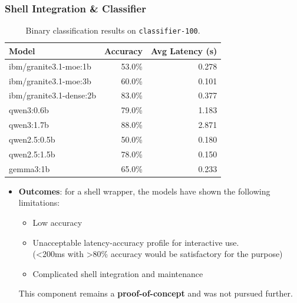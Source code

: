 \documentclass[10pt,aspectratio=169]{beamer}
\begin{document}
\begin{frame}
    \frametitle{Shell Integration \& Classifier}

    \begin{table}[h]
      \centering
      \scriptsize
      \caption{Binary classification results on \texttt{classifier-100}.}
        \begin{tabular}{lrr}
        \toprule
        \textbf{Model} & \textbf{Accuracy} & \textbf{Avg Latency (s)} \\
        \midrule
        ibm/granite3.1-moe:1b & 53.0\% & 0.278 \\
        ibm/granite3.1-moe:3b & 60.0\% & 0.101 \\
        ibm/granite3.1-dense:2b & 83.0\% & 0.377 \\
        qwen3:0.6b & 79.0\% & 1.183 \\
        qwen3:1.7b & 88.0\% & 2.871 \\
        qwen2.5:0.5b & 50.0\% & 0.180 \\
        qwen2.5:1.5b & 78.0\% & 0.150 \\
        gemma3:1b & 65.0\% & 0.233 \\
        \bottomrule
      \end{tabular}\label{tab:eval-classifier-results}
    \end{table}

    \begin{itemize}
        \item \textbf{Outcomes}: for a shell wrapper, the models have shown the
            following limitations:
            \begin{itemize}
                \item Low accuracy
                \item Unacceptable latency-accuracy profile for interactive
                    use.\\
                    (<200ms with >80\% accuracy would be satisfactory for the
                    purpose)
                \item Complicated shell integration and maintenance
            \end{itemize}
            This component remains a \textbf{proof-of-concept} and was not
            pursued further.
    \end{itemize}
\end{frame}
\end{document}

